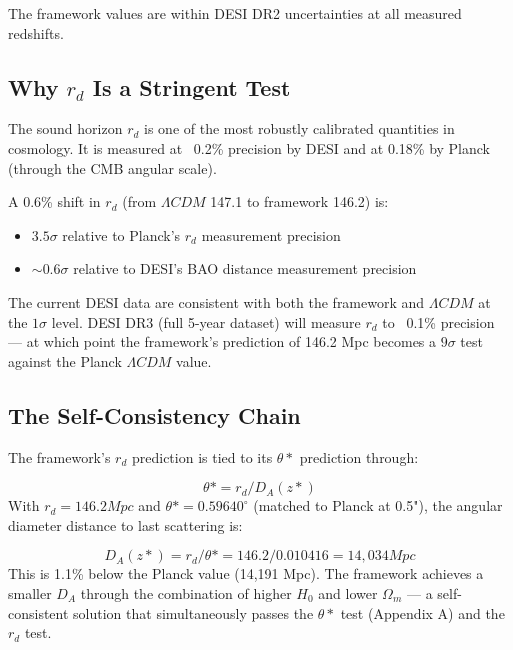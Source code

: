 \documentclass[aps,prd,preprint,superscriptaddress,longbibliography]{revtex4-2}
\begin{document}
The framework values are within DESI DR2 uncertainties at all measured redshifts.



\subsection{Why $r_d$ Is a Stringent Test}

The sound horizon $r_d$ is one of the most robustly calibrated quantities in cosmology. It is measured at ~0.2\% precision by DESI and at 0.18\% by Planck (through the CMB angular scale).

A 0.6\% shift in $r_d$ (from $\Lambda CDM$ 147.1 to framework 146.2) is:

\begin{itemize}
  \item $3.5\sigma$ relative to Planck's $r_d$ measurement precision
  \item $\sim 0.6\sigma$ relative to DESI's BAO distance measurement precision
\end{itemize}

The current DESI data are consistent with both the framework and $\Lambda CDM$ at the $1\sigma$ level. DESI DR3 (full 5-year dataset) will measure $r_d$ to ~0.1\% precision --- at which point the framework's prediction of 146.2 Mpc becomes a $9\sigma$ test against the Planck $\Lambda CDM$ value.



\subsection{The Self-Consistency Chain}

The framework's $r_d$ prediction is tied to its $\theta*$ prediction through:


\begin{equation}
    \theta* = r_d / D_A(z*)
\end{equation}
With $r_d = 146.2 Mpc$ and $\theta* = 0.59640^{\circ}$ (matched to Planck at 0.5"), the angular diameter distance to last scattering is:


\begin{equation}
    D_A(z*) = r_d / \theta* = 146.2 / 0.010416 = 14,034 Mpc
\end{equation}
This is 1.1\% below the Planck value (14,191 Mpc). The framework achieves a smaller $D_A$ through the combination of higher $H_{0}$ and lower $\Omega_m$ --- a self-consistent solution that simultaneously passes the $\theta*$ test (Appendix A) and the $r_d$ test.
\end{document}
